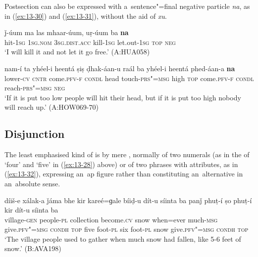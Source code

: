  Postsection can also be expressed with a~sentence"=final negative particle \textit{na}, as in (\ref{ex:13-30}) and (\ref{ex:13-31}), without the aid of \textit{xu}. 

\begin{exe}
\ex
\label{ex:13-30}
\gll ǰ-úum ma las mhaar-úum, uṛ-úum ba \textbf{na}\\
hit-\textsc{1sg} \textsc{1sg.nom} \textsc{3sg.dist.acc} kill-\textsc{1sg} let.out-\textsc{1sg}
\textsc{top} \textsc{neg} \\
\glt `I will kill it and not let it go free.' (A:HUA058)

\ex
\label{ex:13-31}
\gll nam-í ta yhéel-i heentá ṣiṣ ḍhak-áan-u raál ba yhéel-i heentá phed-áan-a \textbf{na} \\
lower-\textsc{cv} \textsc{cntr} come.\textsc{pfv-f} \textsc{condl} head touch-\textsc{prs"=msg}  high \textsc{top} come.\textsc{pfv-f} \textsc{condl} reach-\textsc{prs"=msg} \textsc{neg} \\
\glt `If it is put too low people will hit their head, but if it is put too high nobody will reach up.' (A:HOW069-70)
\end{exe}

\subsection{Disjunction}
\label{subsec:13-2-3}

 The least emphasised kind of  is by mere , normally of two numerals (as in the  of `four' and `five' in (\ref{ex:13-28}) above) or of two  phrases with  attributes, as in (\ref{ex:13-32}), expressing an~ap figure rather than constituting an~alternative in an~absolute sense.

\begin{exe}
\ex
\label{ex:13-32}
\gll díiš-e xálak-a ǰáma bhe kir kareé=ɡale bíiḍ-u dít-u síinta ba {\ob}panǰ phuṭ-í ṣo phuṭ-í{\cb} kir dít-u síinta ba\\
village-\textsc{gen} people-\textsc{pl} collection become.\textsc{cv} snow  when=ever much-\textsc{msg} give.\textsc{pfv"=msg} \textsc{condh} \textsc{top} five  foot-\textsc{pl} six foot-\textsc{pl} snow give.\textsc{pfv"=msg} \textsc{condh} \textsc{top} \\
\glt `The village people used to gather when much snow had fallen, like 5-6 feet of snow.' (B:AVA198) 
\end{exe}

